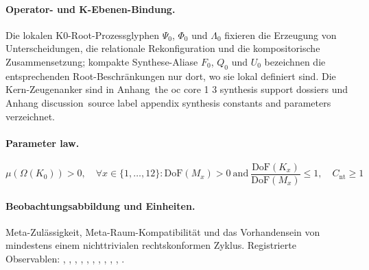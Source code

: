 \paragraph{Operator- und K-Ebenen-Bindung.}
Die lokalen K0-Root-Prozessglyphen \(\Psi_0\), \(\Phi_0\) und \(\Lambda_0\) fixieren die Erzeugung von Unterscheidungen, die relationale Rekonfiguration und die kompositorische Zusammensetzung; kompakte Synthese-Aliase \(F_0\), \(Q_0\) und \(U_0\) bezeichnen die entsprechenden Root-Beschränkungen nur dort, wo sie lokal definiert sind.
Die Kern-Zeugenanker sind in Anhang~the oc core 1 3 synthesis support dossiers und Anhang discussion~source label appendix synthesis constants and parameters verzeichnet.

\paragraph{Parameter law.}
\[
\mu(\Omega(K_0)) > 0,\quad \forall x \in \{1,\dots,12\}: \mathrm{DoF}(M_x)>0\ \mathrm{and}\ \frac{\mathrm{DoF}(K_x)}{\mathrm{DoF}(M_x)} \leq 1,\quad C_{\mathrm{nt}} \geq 1
\]

\paragraph{Beobachtungsabbildung und Einheiten.}
Meta-Zulässigkeit, Meta-Raum-Kompatibilität und das Vorhandensein von mindestens einem nichttrivialen rechtskonformen Zyklus.
Registrierte Observablen: , \allowbreak {}, \allowbreak {}, \allowbreak {}, \allowbreak {}, \allowbreak {}, \allowbreak {}, \allowbreak {}, \allowbreak {}, \allowbreak {}, \allowbreak {}.

